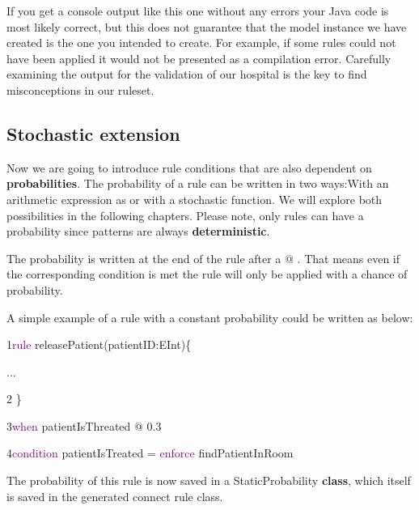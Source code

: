 If you get a console output like this one without any errors your Java code is most likely correct, but this does not guarantee that the model instance we have created is the one you intended to create.\newline
For example, if some rules could not have been applied it would not be presented as a compilation error. Carefully examining the output for the validation of our hospital is the key to find misconceptions in our ruleset.

\clearpage

\subsection{Stochastic extension}

Now we are going to introduce rule conditions that are also dependent on \textbf{probabilities}.
The probability of a rule can be written in two ways:\newline With an arithmetic expression as or with a stochastic function. We will explore both possibilities in the following chapters.\newline
Please note, only rules can have a probability since patterns are always \textbf{deterministic}.

The probability is written at the end of the rule after a \textsf{@} . That means even if the corresponding condition is met the rule will only be applied with a chance of \textsf{probability}.
\newline

A simple example of a rule with a constant probability could be written as below:\newline

{

1\hspace{0.5cm}\textcolor{Purple}{rule} releasePatient(patientID:EInt)\{

\hspace{0.75cm}...

2\hspace{0.5cm} \}

3\hspace{0.5cm}\textcolor{Purple}{when} patientIsThreated @ 0.3 

4\hspace{0.5cm}\textcolor{Purple}{condition} patientIsTreated = \textcolor{Purple}{enforce}  findPatientInRoom \newline
}

The probability of this rule is now saved in a \textsf{StaticProbability} \textbf{class}, which itself is saved in the generated connect rule class.\newline

